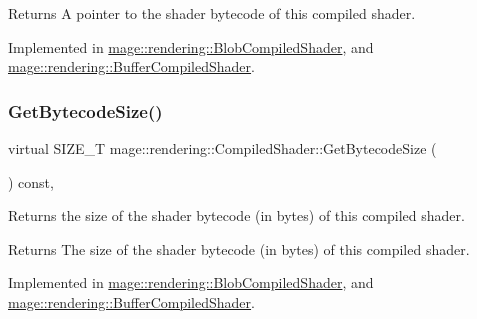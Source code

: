 \begin{DoxyReturn}{Returns}
A pointer to the shader bytecode of this compiled shader. 
\end{DoxyReturn}


Implemented in \mbox{\hyperlink{classmage_1_1rendering_1_1_blob_compiled_shader_a4d7f3d2d9864cb12939386ff031bd783}{mage\+::rendering\+::\+Blob\+Compiled\+Shader}}, and \mbox{\hyperlink{classmage_1_1rendering_1_1_buffer_compiled_shader_a0887622bd25db8698c572d0dc46167b9}{mage\+::rendering\+::\+Buffer\+Compiled\+Shader}}.

\mbox{\label{classmage_1_1rendering_1_1_compiled_shader_a92c17b46242bf884c3d0d673e88a292d}} 
\subsubsection{\texorpdfstring{Get\+Bytecode\+Size()}{GetBytecodeSize()}}
{\footnotesize\ttfamily virtual S\+I\+Z\+E\+\_\+T mage\+::rendering\+::\+Compiled\+Shader\+::\+Get\+Bytecode\+Size (\begin{DoxyParamCaption}{ }\end{DoxyParamCaption}) const\hspace{0.3cm}{\ttfamily [pure virtual]}, {\ttfamily [noexcept]}}

Returns the size of the shader bytecode (in bytes) of this compiled shader.

\begin{DoxyReturn}{Returns}
The size of the shader bytecode (in bytes) of this compiled shader. 
\end{DoxyReturn}


Implemented in \mbox{\hyperlink{classmage_1_1rendering_1_1_blob_compiled_shader_ac3c3edb09ba96367f8c5d6741ec03041}{mage\+::rendering\+::\+Blob\+Compiled\+Shader}}, and \mbox{\hyperlink{classmage_1_1rendering_1_1_buffer_compiled_shader_a235948a6ba0bcac698d6e35ce3504da2}{mage\+::rendering\+::\+Buffer\+Compiled\+Shader}}.

\mbox{\label{classmage_1_1rendering_1_1_compiled_shader_a1981d885693b7849078f509f15b81071}} 
